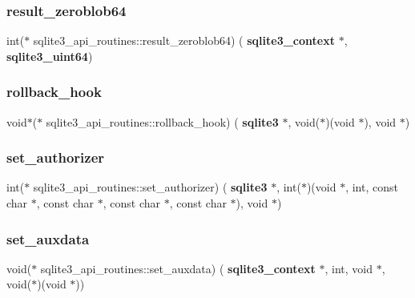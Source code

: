 \subsubsection{result\_zeroblob64}
{\footnotesize\ttfamily int($\ast$ sqlite3\+\_\+api\+\_\+routines\+::result\+\_\+zeroblob64) (\textbf{ sqlite3\+\_\+context} $\ast$, \textbf{ sqlite3\+\_\+uint64})}

\mbox{\label{structsqlite3__api__routines_ac0784da0f9e7abd1cd8417a37e593aaf}} 
\subsubsection{rollback\_hook}
{\footnotesize\ttfamily void$\ast$($\ast$ sqlite3\+\_\+api\+\_\+routines\+::rollback\+\_\+hook) (\textbf{ sqlite3} $\ast$, void($\ast$)(void $\ast$), void $\ast$)}

\mbox{\label{structsqlite3__api__routines_a6d9843596d2d01e52eec89ab50ca6f27}} 
\subsubsection{set\_authorizer}
{\footnotesize\ttfamily int($\ast$ sqlite3\+\_\+api\+\_\+routines\+::set\+\_\+authorizer) (\textbf{ sqlite3} $\ast$, int($\ast$)(void $\ast$, int, const char $\ast$, const char $\ast$, const char $\ast$, const char $\ast$), void $\ast$)}

\mbox{\label{structsqlite3__api__routines_a9e2419b4ef954a24408d3c12fe2b1dd7}} 
\subsubsection{set\_auxdata}
{\footnotesize\ttfamily void($\ast$ sqlite3\+\_\+api\+\_\+routines\+::set\+\_\+auxdata) (\textbf{ sqlite3\+\_\+context} $\ast$, int, void $\ast$, void($\ast$)(void $\ast$))}

\mbox{\label{structsqlite3__api__routines_a91032b40e6e5987b091bcc5658fea445}} 
